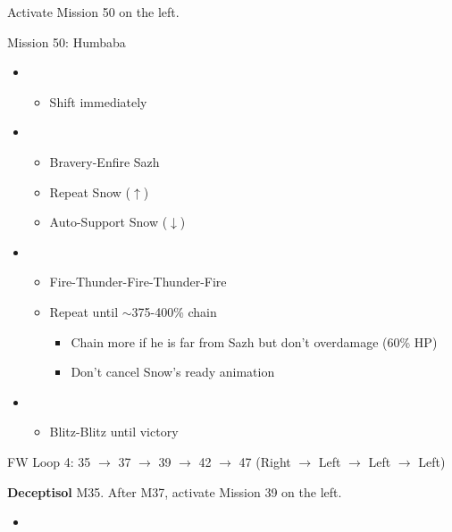 Activate Mission 50 on the left.

\begin{battle}{Mission 50: Humbaba}
	\begin{itemize}
		\item \second
			\begin{itemize}
				\item Shift immediately
			\end{itemize}
		\item \third
			\begin{itemize}
				\item Bravery-Enfire Sazh
				\item Repeat Snow ($\uparrow$)
				\item Auto-Support Snow ($\downarrow$)
			\end{itemize}
		\item \fourth
			\begin{itemize}
				\item Fire-Thunder-Fire-Thunder-Fire
				\item Repeat until $\sim$375-400\% chain
					\begin{itemize}
						\item Chain more if he is far from Sazh but don't overdamage (60\% HP)
						\item Don't cancel Snow's ready animation
					\end{itemize}
			\end{itemize}
		\item \first
			\begin{itemize}
				\item Blitz-Blitz until victory
			\end{itemize}												
	\end{itemize}
\end{battle}

FW Loop 4: 35 $\rightarrow$ 37 $\rightarrow$ 39 $\rightarrow$ 42 $\rightarrow$ 47 (Right $\rightarrow$ Left $\rightarrow$ Left $\rightarrow$ Left)

\textbf{Deceptisol} M35.
After M37, activate Mission 39 on the left.

\begin{menu}
	\begin{itemize}
	\paradigm
		\begin{itemize}
			\item {}%
				{\paradigmline{\com}{(\sen)}{\med}}%
				{\paradigmline{\com}{\com}{\sab}}%
				{\paradigmline[4]{\syn}{\sen}{\sab}}%
				{\paradigmline{\rav}{\rav}{\rav}}%
				{\paradigmline{(\sab)}{\sen}{\sab}}%
				{\paradigmline{\rav}{\sen}{\rav}}%
		\end{itemize}
	\end{itemize}
\end{menu}

